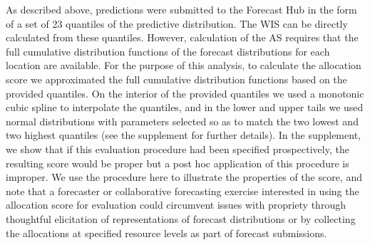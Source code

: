 \documentclass{article}\usepackage[]{graphicx}\usepackage[]{xcolor}
\begin{document}
As described above, predictions were submitted to the Forecast Hub in the form of a set of 23 quantiles of the predictive distribution. The WIS can be directly calculated from these quantiles. However, calculation of the AS requires that the full cumulative distribution functions of the forecast distributions for each location are available. For the purpose of this analysis, to calculate the allocation score we approximated the full cumulative distribution functions based on the provided quantiles. On the interior of the provided quantiles we used a monotonic cubic spline to interpolate the quantiles, and in the lower and upper tails we used normal distributions with parameters selected so as to match the two lowest and two highest quantiles (see the supplement for further details). In the supplement, we show that if this evaluation procedure had been specified prospectively, the resulting score would be proper \textemdash but a post hoc application of this procedure is improper. We use the procedure here to illustrate the properties of the score, and note that a forecaster or collaborative forecasting exercise interested in using the allocation score for evaluation could circumvent issues with propriety through thoughtful elicitation of representations of forecast distributions or by collecting the allocations at specified resource levels as part of forecast submissions.




\end{document}
